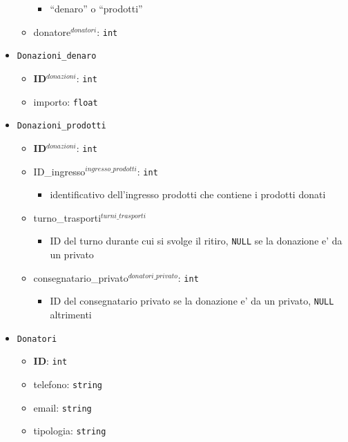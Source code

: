 \documentclass[]{article}
\providecommand{\tightlist}{%
  \setlength{\itemsep}{0pt}\setlength{\parskip}{0pt}}
\begin{document}
\begin{itemize}
\begin{itemize}
    \begin{itemize}
    \tightlist
    \item
      ``denaro'' o ``prodotti''
    \end{itemize}
  \item
    donatore\(^{donatori}\): \texttt{int}
  \end{itemize}
\item
  \texttt{Donazioni\_denaro}

  \begin{itemize}
  \tightlist
  \item
    \textbf{ID}\(^{donazioni}\): \texttt{int}
  \item
    importo: \texttt{float}
  \end{itemize}
\item
  \texttt{Donazioni\_prodotti}

  \begin{itemize}
  \tightlist
  \item
    \textbf{ID}\(^{donazioni}\): \texttt{int}
  \item
    ID\_ingresso\(^{ingresso\_prodotti}\): \texttt{int}

    \begin{itemize}
    \tightlist
    \item
      identificativo dell'ingresso prodotti che contiene i prodotti
      donati
    \end{itemize}
  \item
    turno\_trasporti\(^{turni\_trasporti}\)

    \begin{itemize}
    \tightlist
    \item
      ID del turno durante cui si svolge il ritiro, \texttt{NULL} se la
      donazione e' da un privato
    \end{itemize}
  \item
    consegnatario\_privato\(^{donatori\_privato}\): \texttt{int}

    \begin{itemize}
    \tightlist
    \item
      ID del consegnatario privato se la donazione e' da un privato,
      \texttt{NULL} altrimenti
    \end{itemize}
  \end{itemize}
\item
  \texttt{Donatori}

  \begin{itemize}
  \tightlist
  \item
    \textbf{ID}: \texttt{int}
  \item
    telefono: \texttt{string}
  \item
    email: \texttt{string}
  \item
    tipologia: \texttt{string}


\end{itemize}
\end{itemize}
\end{document}
